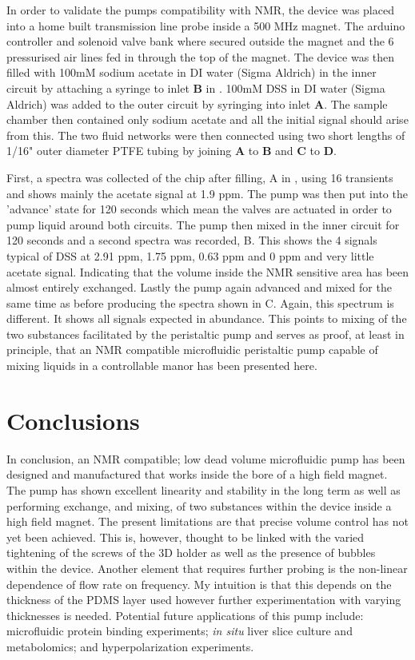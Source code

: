 In order to validate the pumps compatibility with NMR, the device was placed into a home
built transmission line probe inside a 500 MHz magnet. The arduino controller and solenoid valve
bank where secured outside the magnet and the 6 pressurised air lines fed in through the top of
the magnet. The device was then filled with 100mM sodium acetate in DI water (Sigma Aldrich) in
the inner circuit by attaching a syringe to inlet \textbf{B} in . 100mM DSS in DI
water (Sigma Aldrich) was added to the outer circuit by syringing into inlet \textbf{A}. The sample
chamber then contained only sodium acetate and all the initial signal should arise from this. The two fluid networks
were then connected using two short lengths of 1/16" outer diameter PTFE tubing by joining
\textbf{A} to \textbf{B} and \textbf{C} to \textbf{D}.

First, a spectra was collected of the chip after filling, A in , using 16
transients and shows mainly the acetate signal at 1.9 ppm. The pump was then put into
the 'advance' state for 120 seconds which mean the valves are actuated in order to pump
liquid around both circuits. The pump then mixed in the inner circuit for 120 seconds
and a second spectra was recorded, B. This shows the 4 signals typical of DSS at 2.91
ppm, 1.75 ppm, 0.63 ppm and 0 ppm and very little acetate signal. Indicating that the
volume inside the NMR sensitive area has been almost entirely exchanged. Lastly the
pump again advanced and mixed for the same time as before producing the spectra shown
in C. Again, this spectrum is different. It shows all signals expected in abundance.
This points to mixing of the two substances facilitated by the peristaltic pump and serves
as proof, at least in principle, that an NMR compatible microfluidic peristaltic pump
capable of mixing liquids in a controllable manor has been presented here.

\section{Conclusions}

In conclusion, an NMR compatible; low dead volume microfluidic pump has been designed and
manufactured that works inside the bore of a high field magnet. The pump has shown
excellent linearity and stability in the long term as well as performing exchange, and
mixing, of two substances within the device inside a high field magnet. The present limitations
are that precise volume control has not yet been achieved. This is, however, thought to be linked
with the varied tightening of the screws of the 3D holder as well as the presence of bubbles
within the device. Another element that requires further probing is the non-linear dependence of
flow rate on frequency. My intuition is that this depends on the thickness of the PDMS layer
used
however further experimentation with varying thicknesses is needed. Potential future
applications
of this pump include: microfluidic protein binding experiments; \textit{in situ} liver slice
culture and metabolomics; and hyperpolarization experiments.
